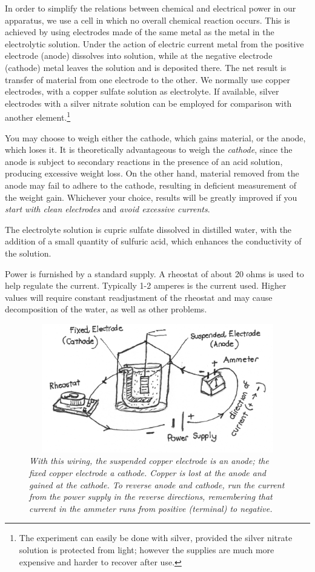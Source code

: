 In order to simplify the relations between chemical and electrical power
in our ap\-pa\-ra\-tus, we use a cell in which no overall chemical reaction
occurs. This is achieved by using electrodes made of the same metal as
the metal in the electrolytic solution. Under the action of electric
current metal from the positive electrode (anode) dissolves into
solution, while at the negative electrode (cathode) metal leaves the
solution and is deposited there. The net result is transfer of material
from one electrode to the other. We normally use copper electrodes, with
a copper sulfate solution as electrolyte. If available, silver
electrodes with a silver nitrate solution can be employed for comparison
with another element.\footnote{The experiment can easily be done with
  silver, provided the silver nitrate solution is protected from light;
  however the supplies are much more expensive and harder to recover
  after use.}

You may choose to weigh either the cathode, which gains material, or the
anode, which loses it. It is theoretically advantageous to weigh the
\emph{cathode}, since the anode is subject to secondary reactions in the
presence of an acid solution, producing excessive weight loss. On the
other hand, material removed from the anode may fail to adhere to the
cathode, resulting in deficient measurement of the weight gain.
Whichever your choice, results will be greatly improved if you
\emph{start with clean electrodes} and \emph{avoid excessive currents}.

The electrolyte solution is cupric sulfate dissolved in distilled water,
with the ad\-di\-tion of a small quantity of sulfuric acid, which enhances
the conductivity of the solution.

Power is furnished by a standard supply. A rheostat of about 20 ohms is
used to help regulate the current. Typically 1-2 amperes is the current
used. Higher values will require constant readjustment of the rheostat
and may cause de\-com\-po\-si\-tion of the water, as well as other problems.
\begin{figure}
\centering
\includegraphics[width=4.88403in,height=2.20694in]{images/01_faraday/image003.png}
\caption*{\emph{With this wiring, the suspended copper electrode is an anode; the
fixed copper electrode a cathode. Copper is lost at the anode and gained at the cathode.
To reverse anode and cathode, run the current from the power
supply in the reverse directions, remembering that current in the
ammeter runs from positive (terminal) to negative.}}
\end{figure}

